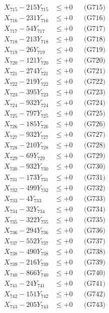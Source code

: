 \documentclass[a4paper,10pt]{article}
\begin{document}
{\begin{align}
X_{715} - 215Y_{715} &\leq +0 && \text{(G715)} \\
X_{716} - 231Y_{716} &\leq +0 && \text{(G716)} \\
X_{717} - 54Y_{717} &\leq +0 && \text{(G717)} \\
X_{718} - 213Y_{718} &\leq +0 && \text{(G718)} \\
X_{719} - 26Y_{719} &\leq +0 && \text{(G719)} \\
X_{720} - 121Y_{720} &\leq +0 && \text{(G720)} \\
\allowbreak
X_{721} - 274Y_{721} &\leq +0 && \text{(G721)} \\
X_{722} - 219Y_{722} &\leq +0 && \text{(G722)} \\
X_{723} - 395Y_{723} &\leq +0 && \text{(G723)} \\
X_{724} - 932Y_{724} &\leq +0 && \text{(G724)} \\
X_{725} - 797Y_{725} &\leq +0 && \text{(G725)} \\
X_{726} - 185Y_{726} &\leq +0 && \text{(G726)} \\
X_{727} - 932Y_{727} &\leq +0 && \text{(G727)} \\
X_{728} - 210Y_{728} &\leq +0 && \text{(G728)} \\
X_{729} - 69Y_{729} &\leq +0 && \text{(G729)} \\
X_{730} - 932Y_{730} &\leq +0 && \text{(G730)} \\
\allowbreak
X_{731} - 173Y_{731} &\leq +0 && \text{(G731)} \\
X_{732} - 499Y_{732} &\leq +0 && \text{(G732)} \\
X_{733} - 4Y_{733} &\leq +0 && \text{(G733)} \\
X_{734} - 32Y_{734} &\leq +0 && \text{(G734)} \\
X_{735} - 322Y_{735} &\leq +0 && \text{(G735)} \\
X_{736} - 294Y_{736} &\leq +0 && \text{(G736)} \\
X_{737} - 552Y_{737} &\leq +0 && \text{(G737)} \\
X_{738} - 490Y_{738} &\leq +0 && \text{(G738)} \\
X_{739} - 216Y_{739} &\leq +0 && \text{(G739)} \\
X_{740} - 866Y_{740} &\leq +0 && \text{(G740)} \\
\allowbreak
X_{741} - 24Y_{741} &\leq +0 && \text{(G741)} \\
X_{742} - 151Y_{742} &\leq +0 && \text{(G742)} \\
X_{743} - 205Y_{743} &\leq +0 && \text{(G743)} \\

\end{align}}
\end{document}
